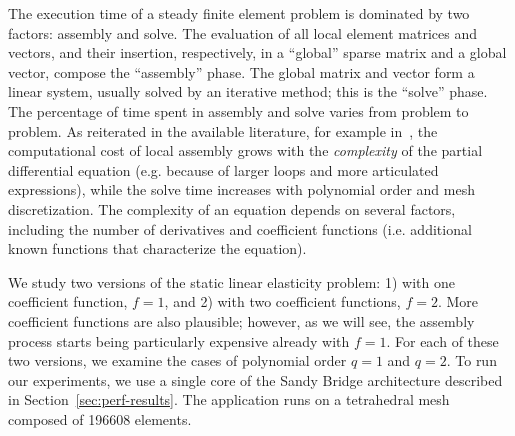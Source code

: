 The execution time of a steady finite element problem is dominated by two factors: assembly and solve. The evaluation of all local element matrices and vectors, and their insertion, respectively, in a ``global'' sparse matrix and a global vector, compose the ``assembly'' phase. The global matrix and vector form a linear system, usually solved by an iterative method; this is the ``solve'' phase. The percentage of time spent in assembly and solve varies from problem to problem. As reiterated in the available literature, for example in~\cite{quadrature1}, the computational cost of local assembly grows with the \textit{complexity} of the partial differential equation (e.g. because of larger loops and more articulated expressions), while the solve time increases with polynomial order and mesh discretization. The complexity of an equation depends on several factors, including the number of derivatives and coefficient functions (i.e. additional known functions that characterize the equation).

We study two versions of the static linear elasticity problem: 1) with one coefficient function, $f=1$, and 2) with two coefficient functions, $f=2$. More coefficient functions are also plausible; however, as we will see, the assembly process starts being particularly expensive already with $f=1$. For each of these two versions, we examine the cases of polynomial order $q=1$ and $q=2$. To run our experiments, we use a single core of the Sandy Bridge architecture described in Section~\ref{sec:perf-results}. The application runs on a tetrahedral mesh composed of 196608 elements.

